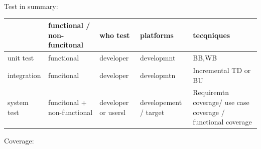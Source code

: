 \documentclass[12pt]{article}
\begin{document}
Test in summary:
\begin{center}
  \begin{tabular}{|p{}|p{}|p{}|p{}|p{}|}
    \hline
    & functional / non-funcitonal & who test & platforms & tecqniques \\
    \hline
    unit test & functional & developer & developmnt & BB,WB \\
    \hline
    integration & funcitonal & developer & developmtn & Incremental TD or BU \\
    \hline
    system test & funcitonal + non-functional & developer or usersl & developement / target & Requiremtn coverage/ use case coverage / functional coverage \\
    \hline
  \end{tabular}
\end{center}

Coverage: 




\newpage
\end{document}
